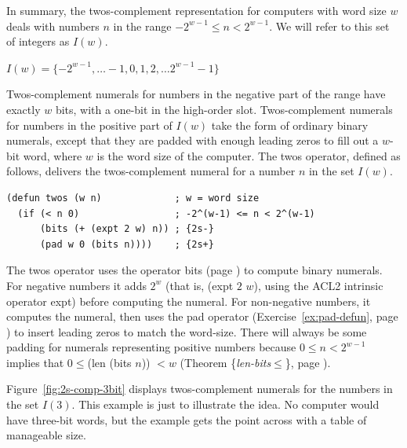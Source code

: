 In summary, the twos-complement representation for computers with
word size $w$ deals with numbers $n$ in the range
$-2^{w-1} \leq n < 2^{w-1}$.
We will refer to this set of integers as $I(w)$.
\label{def-Iw}
\begin{center}
$I(w) = \{-2^{w-1}, \dots -1, 0, 1, 2, \dots 2^{w-1}-1\}$
\end{center}

Twos-complement numerals for numbers in the negative part of the range
have exactly $w$ bits, with a one-bit in the high-order slot.
Twos-complement numerals for numbers in the positive part of $I(w)$
take the form of ordinary binary numerals, except that
they are padded with enough leading zeros
to fill out a $w$-bit word, where $w$ is the word size of the computer.
The \textsf{twos} operator, defined as follows, delivers the twos-complement numeral
for a number $n$ in the set $I(w)$.

\label{twos-defun}
\begin{Verbatim}
(defun twos (w n)             ; w = word size
  (if (< n 0)                 ; -2^(w-1) <= n < 2^(w-1)
      (bits (+ (expt 2 w) n)) ; {2s-}
      (pad w 0 (bits n))))    ; {2s+}
\end{Verbatim}

The \textsf{twos} operator uses the operator \textsf{bits} (page \pageref{bits-defun})
to compute binary numerals.
For negative numbers it adds $2^w$
(that is, \textsf{(expt $2$ $w$)},
using the ACL2 intrinsic operator \textsf{expt})
before computing the numeral.
For non-negative numbers, it computes the numeral,
then uses the \textsf{pad} operator (Exercise~\ref{ex:pad-defun}, page \pageref{ex:pad-defun})
to insert leading zeros to match the word-size.
There will always be some padding for numerals representing
positive numbers because
$0 \le n < 2^{w-1}$ implies that
$0 \le $(len (bits $n$)) $< w$
(Theorem \{\emph{len-bits}$\le$\}, page \pageref{len-bitsLE}).

Figure~\ref{fig:2s-comp-3bit} displays
twos-complement numerals for the numbers in the set $I(3)$.
This example is just to illustrate the idea.
No computer would have three-bit words,
but the example gets the point across with a table of manageable size.

